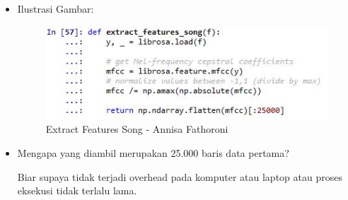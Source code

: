 \begin{enumerate}
\begin{itemize}
\item Ilustrasi Gambar:

\begin{figure}[!hbtp]
\centering
\includegraphics[scale=0.6]{figures/Chapter6AnnisaFathoroni12.jpg}
\caption{Extract Features Song - Annisa Fathoroni}
\label{Extract Features Song - Annisa Fathoroni}
\end{figure}

\item Mengapa yang diambil merupakan 25.000 baris data pertama?

Biar supaya tidak terjadi overhead pada komputer atau laptop atau proses eksekusi tidak terlalu lama.

\end{itemize}


\end{enumerate}
